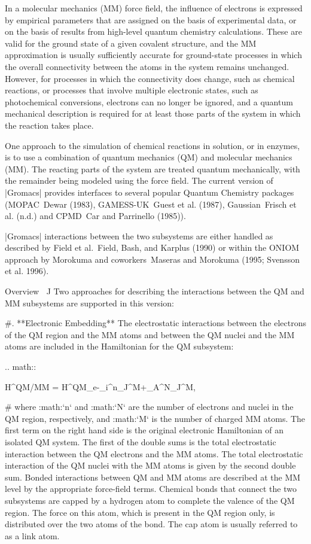 In a molecular mechanics (MM) force field, the influence of electrons is
expressed by empirical parameters that are assigned on the basis of
experimental data, or on the basis of results from high-level quantum
chemistry calculations. These are valid for the ground state of a given
covalent structure, and the MM approximation is usually sufficiently
accurate for ground-state processes in which the overall connectivity
between the atoms in the system remains unchanged. However, for
processes in which the connectivity does change, such as chemical
reactions, or processes that involve multiple electronic states, such as
photochemical conversions, electrons can no longer be ignored, and a
quantum mechanical description is required for at least those parts of
the system in which the reaction takes place.

One approach to the simulation of chemical reactions in solution, or in
enzymes, is to use a combination of quantum mechanics (QM) and molecular
mechanics (MM). The reacting parts of the system are treated quantum
mechanically, with the remainder being modeled using the force field.
The current version of |Gromacs| provides interfaces to several popular
Quantum Chemistry packages (MOPAC Dewar (1983), GAMESS-UK Guest et al.
(1987), Gaussian Frisch et al. (n.d.) and CPMD Car and Parrinello
(1985)).

|Gromacs| interactions between the two subsystems are either handled as
described by Field et al. Field, Bash, and Karplus (1990) or within
the ONIOM approach by Morokuma and coworkers Maseras and Morokuma (1995;
Svensson et al. 1996).

Overview
^^^^^^^^

Two approaches for describing the interactions between the QM and MM
subsystems are supported in this version:

#. **Electronic Embedding** The electrostatic interactions between the
   electrons of the QM region and the MM atoms and between the QM nuclei
   and the MM atoms are included in the Hamiltonian for the QM
   subsystem:

   .. math::

      H^{QM/MM} =
      H^{QM}_e-\sum_i^n\sum_J^M+\sum_A^N\sum_J^M,

#  where :math:`n` and :math:`N` are the number of electrons and nuclei
   in the QM region, respectively, and :math:`M` is the number of
   charged MM atoms. The first term on the right hand side is the
   original electronic Hamiltonian of an isolated QM system. The first
   of the double sums is the total electrostatic interaction between the
   QM electrons and the MM atoms. The total electrostatic interaction of
   the QM nuclei with the MM atoms is given by the second double sum.
   Bonded interactions between QM and MM atoms are described at the MM
   level by the appropriate force-field terms. Chemical bonds that
   connect the two subsystems are capped by a hydrogen atom to complete
   the valence of the QM region. The force on this atom, which is
   present in the QM region only, is distributed over the two atoms of
   the bond. The cap atom is usually referred to as a link atom.

